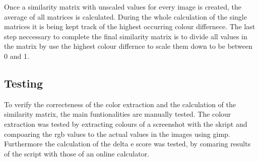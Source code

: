 %	
Once a similarity matrix with unscaled values for every image is created, the average of all matrices is calculated. During the whole calculation of the single matrices it is being kept track of the highest occurring colour differnece. The last step neccessary to complete the final similarity matrix is to divide all values in the matrix by use the highest colour differnce to scale them down to be between 0 and 1. 




\subsection{Testing}
To verify the correcteness of the color extraction and the calculation of the similarity matrix, the main funtionalities are manually tested. The colour extraction was tested by extracting colours of a screenshot with the skript and compoaring the rgb values to the actual values in the images using gimp. Furthermore the calculation of the delta e score was tested, by comaring results of the script with those of an online calculator. \\

